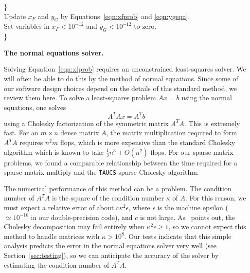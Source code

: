 \documentclass[acmtoms,acmnow,aps,floatfix]{acmtrans2m}
\renewcommand{\subsection}[1]{\medskip\noindent\textbf{#1.} }
\def\marginpar#1{}   %
\let\lbl=\label
\def\label#1{\lbl{#1}\ifinner\else\marginpar{\ref{#1} #1}\ignorespaces\fi}
\newcommand{\tsnnls}{\texttt{tsnnls} }
\begin{document}
\begin{center}
\begin{minipage}{6.5in}
\begin{tabbing}
\hspace*{1em} \} \\
\hspace*{1em}Update $x_F$ and $y_G$ by Equations~\ref{eqn:xfprob} and \ref{eqn:ygeqn}.\\
\hspace*{1em}Set variables in $x_F < 10^{-12}$ and $y_G < 10^{-12}$ to zero.\\
\} \\
\end{tabbing}
\end{minipage}
\end{center}

\vspace{-0.2in}
\subsection{The normal equations solver}

Solving Equation~\ref{eqn:xfprob} requires an unconstrained least-squares solver. We will often 
be able to do this by the method of normal equations. Since some of our software design choices depend on the details of this standard method, we review them here. To solve a least-squares problem $Ax = b$ using the normal equations, one solves 
\begin{equation}
A^T\!A x = A^T b
\end{equation}
using a Cholesky factorization of the symmetric matrix $A^T\!A$. This is extremely fast. For an $m \times n$ dense matrix $A$, the matrix multiplication required to form $A^T\!A$ requires $n^2 m$ flops, which is more expensive than the standard Cholesky algorithm which is known to take $\frac{1}{3} n^3 + O(n^2)$ flops. For our sparse matrix problems, we found a comparable relationship between the time required for a sparse matrix-multiply and the \texttt{TAUCS} sparse Cholesky algorithm. 

The numerical performance of this method can be a problem. The condition number of $A^T\!A$ is the square of the condition number $\kappa$ of $A$. For this reason, we must expect a relative error of about $c \kappa^2 \epsilon$, where $\epsilon$ is the machine epsilon ($\simeq \!\! 10^{-16}$ in our double-precision code), and $c$ is not large. As~\cite{MR92k:65056} points out, the Cholesky decomposition may fail entirely when $\kappa^2 \epsilon \geq 1$, so we cannot expect this method to handle matrices with $\kappa > 10^8$. Our tests indicate that this simple analysis predicts the error in the normal equations solver very well (see Section~\ref{sec:testing}), so we can anticipate the accuracy of the solver by estimating the condition number of $A^T\!A$.
\end{document}
